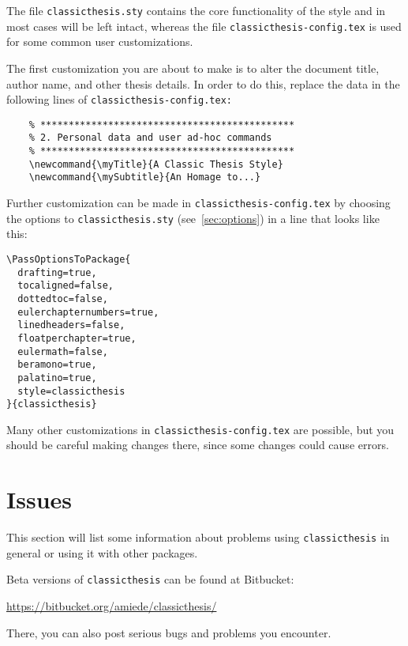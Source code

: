 The file \texttt{classicthesis.sty}
contains the core functionality of the style and in most cases will
be left intact, whereas the file \texttt{classic\-thesis-config.tex}
is used for some common user customizations.

The first customization you are about to make is to alter the document
title, author name, and other thesis details. In order to do this, replace
the data in the following lines of \texttt{classicthesis-config.tex:}%

\begin{lstlisting}
    % *********************************************
    % 2. Personal data and user ad-hoc commands
    % *********************************************
    \newcommand{\myTitle}{A Classic Thesis Style}
    \newcommand{\mySubtitle}{An Homage to...}
\end{lstlisting}

Further customization can be made in \texttt{classicthesis-config.tex}
by choosing the options to \texttt{classicthesis.sty}
(see~\autoref{sec:options}) in a line that looks like this:

\begin{lstlisting}
\PassOptionsToPackage{
  drafting=true,
  tocaligned=false,
  dottedtoc=false,
  eulerchapternumbers=true,
  linedheaders=false,
  floatperchapter=true,
  eulermath=false,
  beramono=true,
  palatino=true,
  style=classicthesis
}{classicthesis}
\end{lstlisting}

Many other customizations in \texttt{classicthesis-config.tex} are
possible, but you should be careful making changes there, since some
changes could cause errors.



\section{Issues}\label{sec:issues}
This section will list some information about problems using
\texttt{classic\-thesis} in general or using it with other packages.

Beta versions of \texttt{classicthesis} can be found at Bitbucket:
\begin{center}
    \url{https://bitbucket.org/amiede/classicthesis/}
\end{center}
There, you can also post serious bugs and problems you encounter.


